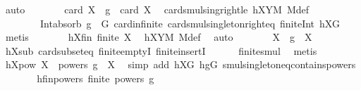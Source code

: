 \begin{isabellebody}
\ auto\isanewline
\ \ \ \ \isamarkupfalse%
\ \isamarkupfalse%
\ {\isachardoublequoteopen}card\ X\ {\isasymcdots}\ {\isacharbraceleft}{\kern0pt}g{\isacharbraceright}{\kern0pt}\ {\isacharequal}{\kern0pt}\ card\ X{\isachardoublequoteclose}\ \isamarkupfalse%
\ card{\isacharunderscore}{\kern0pt}smul{\isacharunderscore}{\kern0pt}sing{\isacharunderscore}{\kern0pt}right{\isacharunderscore}{\kern0pt}le\ hXYM\ M{\isacharunderscore}{\kern0pt}def\ \isanewline
\ \ \ \ \ \ \ \ Int{\isacharunderscore}{\kern0pt}absorb{}\ {\isacartoucheopen}g\ {\isasymin}\ G{\isacartoucheclose}\ card{\isachardot}{\kern0pt}infinite\ card{\isacharunderscore}{\kern0pt}smul{\isacharunderscore}{\kern0pt}singleton{\isacharunderscore}{\kern0pt}right{\isacharunderscore}{\kern0pt}eq\ finite{\isacharunderscore}{\kern0pt}Int\ hXG\ \isamarkupfalse%
\ metis\isanewline
\ \ \ \ \isamarkupfalse%
\ \isamarkupfalse%
\ hXfin{\isacharcolon}{\kern0pt}\ {\isachardoublequoteopen}finite\ X{\isachardoublequoteclose}\ \isamarkupfalse%
\ hXYM\ M{\isacharunderscore}{\kern0pt}def\ \isamarkupfalse%
\ auto\isanewline
\ \ \ \ \isamarkupfalse%
\ \isamarkupfalse%
\ {\isachardoublequoteopen}X\ {\isasymcdots}\ {\isacharbraceleft}{\kern0pt}g{\isacharbraceright}{\kern0pt}\ {\isacharequal}{\kern0pt}\ X{\isachardoublequoteclose}\ \isamarkupfalse%
\ hXsub\ card{\isacharunderscore}{\kern0pt}subset{\isacharunderscore}{\kern0pt}eq\ finite{\isachardot}{\kern0pt}emptyI\ finite{\isachardot}{\kern0pt}insertI\isanewline
\ \ \ \ \ \ finite{\isacharunderscore}{\kern0pt}smul\ \isamarkupfalse%
\ metis\isanewline
\ \ \ \ \isamarkupfalse%
\ \isamarkupfalse%
\ hXpow{\isacharcolon}{\kern0pt}\ {\isachardoublequoteopen}X\ {\isasymcdots}\ {\isacharparenleft}{\kern0pt}powers\ g{\isacharparenright}{\kern0pt}\ {\isacharequal}{\kern0pt}\ X{\isachardoublequoteclose}\ \isamarkupfalse%
\ {\isacharparenleft}{\kern0pt}simp\ add{\isacharcolon}{\kern0pt}\ hXG\ hgG\ smul{\isacharunderscore}{\kern0pt}singleton{\isacharunderscore}{\kern0pt}eq{\isacharunderscore}{\kern0pt}contains{\isacharunderscore}{\kern0pt}powers{\isacharparenright}{\kern0pt}\isanewline
\ \ \ \ \isamarkupfalse%
\ \isamarkupfalse%
\ hfinpowers{\isacharcolon}{\kern0pt}\ {\isachardoublequoteopen}finite\ {\isacharparenleft}{\kern0pt}powers\ g{\isacharparenright}{\kern0pt}{\isachardoublequoteclose}\isanewline

\end{isabellebody}
